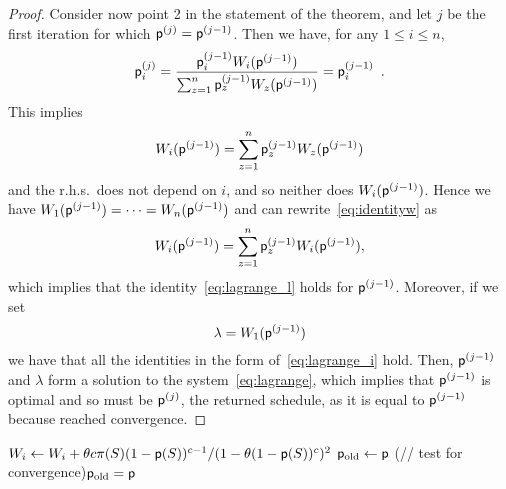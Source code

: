 \begin{proof}
	Consider now point 2 in the statement of the theorem, and let $j$ be the
	first iteration for which $\mathsf{p}^{(j)}=\mathsf{p}^{(j-1)}$. Then we have, for
	any $1\le i\le n$,
	\[
		\mathsf{p}^{(j)}_i = \frac{\mathsf{p}^{(j-1)}_i W_i(\mathsf{p}^{(j-1)})}{\sum_{z=1}^n
		\mathsf{p}^{(j-1)}_z W_z(\mathsf{p}^{(j-1)})} = \mathsf{p}^{(j-1)}_i\enspace.
	\]
	This implies
	\begin{equation}\label{eq:identityw}
		W_i(\mathsf{p}^{(j-1)}) = \sum_{z=1}^n \mathsf{p}^{(j-1)}_z W_z(\mathsf{p}^{(j-1)})
	\end{equation}
	and the r.h.s.~does not depend on $i$, and so neither does
	$W_i(\mathsf{p}^{(j-1)})$. Hence we have
	$W_1(\mathsf{p}^{(j-1)})=\dotsb=W_n(\mathsf{p}^{(j-1)})$ and can
	rewrite~\eqref{eq:identityw} as
	\[
		W_i(\mathsf{p}^{(j-1)}) =  \sum_{z=1}^n \mathsf{p}^{(j-1)}_z
		W_i(\mathsf{p}^{(j-1)}),
	\]
	which implies that the identity~\eqref{eq:lagrange_l} holds for
	$\mathsf{p}^{(j-1)}$. Moreover, if we set
	\[
		\lambda = W_1(\mathsf{p}^{(j-1)})
	\]
	we have that all the identities in the form of~\eqref{eq:lagrange_i} hold.
	Then, $\mathsf{p}^{(j-1)}$ and $\lambda$ form a solution to the
	system~\eqref{eq:lagrange}, which implies that $\mathsf{p}^{(j-1)}$ is optimal
	and so must be $\mathsf{p}^{(j)}$, the returned schedule, as it is equal to
	$\mathsf{p}^{(j-1)}$ because \algoname reached convergence.
\end{proof}

\begin{algorithm}[ht]
	\DontPrintSemicolon
	 {
		 {\label{algline:sum}
			 {
				$W_i \leftarrow W_i + \theta c \pi(S) (1-\mathsf{p}(S))^{c-1}/(1-\theta(1-\mathsf{p}(S))^c)^2$\label{algline:w}\;
			}
		}
		$\mathsf{p}_{\mathrm{old}}\leftarrow \mathsf{p}$\;
		\If(// test for convergence){$\mathsf{p}_{\mathrm{old}} = \mathsf{p}$} {
			\KwBreak\;
		}
	}
	\Return{$\sched$}\;
	\caption{\algoname}
	\label{alg:iterative}
\end{algorithm}

